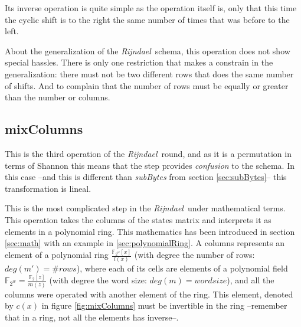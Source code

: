 \documentclass[10pt,a4paper,twoside]{llncs}
\newcommand{\todo}[1]{\texttt{\color{red}TODO:} ``\emph{#1}''}
\newcommand{\rijndael}{\emph{Rijndael}}
\newcommand{\Fpn}[2]{\ensuremath{\mathbb{F}_{#1^#2}}}
\newcommand{\Fpnm}[2]{\ensuremath{\frac{\Fpn{2}{#1}[#2]}{m(#2)}}}
\begin{document}
Its inverse operation is quite simple as the operation itself is, only that this time the cyclic shift is to the right the same number of times that was before to the left.

About the generalization of the \rijndael\, schema, this operation does not show special hassles. There is only one restriction that makes a constrain in the generalization: there must not be two different rows that does the same number of shifts. And to complain that the number of rows must be equally or greater than the number or columns.

\subsection{mixColumns}\label{sec:mixColumns}
This is the third operation of the \rijndael\, round, and as it is a permutation in terms of Shannon this means that the step provides \emph{confusion} to the schema. In this case --and this is different than \emph{subBytes} from section \ref{sec:subBytes}-- this transformation is lineal.

This is the most complicated step in the \rijndael\, under mathematical terms. This operation takes the columns of the states matrix and interprets it as elements in a polynomial ring. This mathematics has been introduced in section \ref{sec:math} with an example in \ref{sec:polynomialRing}. A columns represents an element of a polynomial ring $\frac{\Fpn{2}{w}[x]}{l(x)}$ (with degree the number of rows: $deg(m')=\#rows$), where each of its cells are elements of a polynomial field $\Fpn{2}{w}=\frac{\mathbb{F}_{2}[z]}{m(z)}$  (with degree the word size: $deg(m)=wordsize$), and all the columns were operated with another element of the ring. This element, denoted by $c(x)$ in figure \ref{fig:mixColumns} must be invertible in the ring --remember that in a ring, not all the elements has inverse--.

\end{document}
